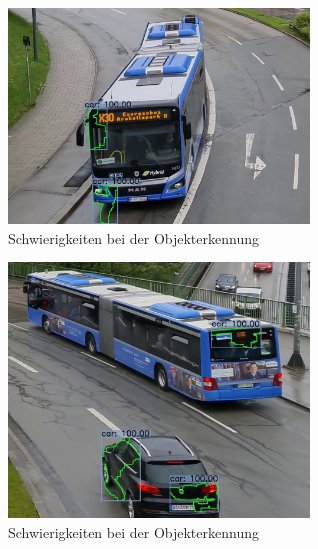\documentclass[conference]{IEEEtran}
\begin{document}
	\begin{figure}[!h]
		\begin{center}
			\includegraphics[width=8cm]{Media/Output_847MOG1.jpg}
			\caption{Schwierigkeiten bei der Objekterkennung}
			\label{mogFehler3}
		\end{center}
	\end{figure}
	\begin{figure}[!h]
	\begin{center}
		\includegraphics[width=8cm]{Media/Output_847MOG2.jpg}
		\caption{Schwierigkeiten bei der Objekterkennung}
		\label{mogFehler4}
	\end{center}
\end{figure}
	
\end{document}
